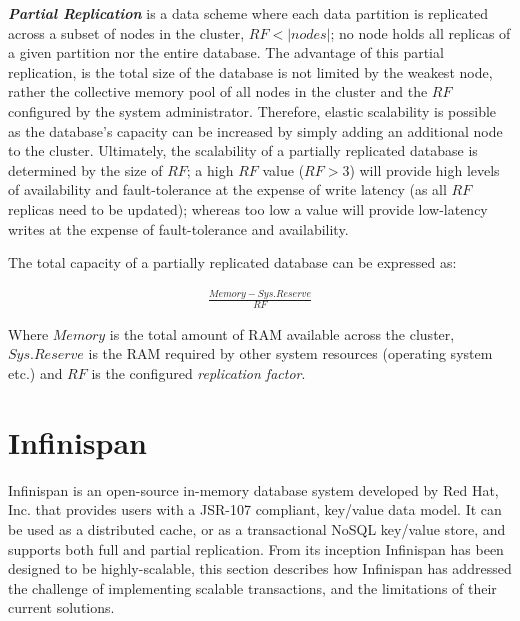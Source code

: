 	\textbf{\emph{Partial Replication}} is a data scheme where each data partition is replicated across a subset of nodes in the cluster, $RF < \left\vert nodes \right\vert$; no node holds all replicas of a given partition nor the entire database.  The advantage of this partial replication, is the total size of the database is not limited by the weakest node, rather the collective memory pool of all nodes in the cluster and the $RF$ configured by the system administrator.  Therefore, elastic scalability is possible as the database's capacity can be increased by simply adding an additional node to the cluster.  Ultimately, the scalability of a partially replicated database is determined by the size of $RF$; a high $RF$ value ($RF > 3$) will provide high levels of availability and fault-tolerance at the expense of write latency (as all $RF$ replicas need to be updated); whereas too low a value will provide low-latency writes at the expense of fault-tolerance and availability.   
	
	The total capacity of a partially replicated database can be expressed as:
	
	\begin{equation*}
		     \begin{aligned}
		       \frac{Memory - Sys.Reserve}{RF}
		     \end{aligned}
	\end{equation*}	
	
	 Where $Memory$ is the total amount of RAM available across the cluster, $Sys.Reserve$ is the RAM required by other system resources (operating system etc.) and $RF$ is the configured \emph{replication factor}.  


\section{Infinispan}\label{sec:infinispan}
Infinispan\citep{Infinispan} is an open-source in-memory database system developed by Red Hat, Inc\citep{RedHat}. that provides users with a JSR-107\citep{JSR-107} compliant, key/value data model.  It can be used as a distributed cache, or as a transactional NoSQL key/value store, and supports both full and partial replication.  From its inception Infinispan has been designed  to be highly-scalable, this section describes how Infinispan has addressed the challenge of implementing scalable transactions, and the limitations of their current solutions.  

